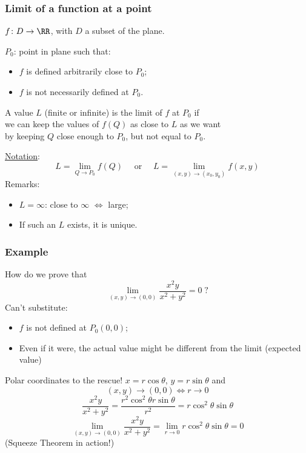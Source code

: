 \begin{frame}
\frametitle{Limit of a function at a point}
  $f\colon D \to \RR$, with $D$ a subset of the plane.

  $P_0$: point in plane such that:
  \begin{itemize}
    \item $f$ is defined arbitrarily close to $P_0$;
    \item $f$ is not necessarily defined at $P_0$.
  \end{itemize}

  \begin{definition}
    A value $L$ (finite or infinite) is
    \textcolor[rgb]{0.98,0.00,0.00}{the limit of $f$ at $P_0$} if \\
    we can keep the values of $f(Q)$ as close to $L$ as we want \\
    by keeping $Q$ close enough to $P_0$, but not equal to $P_0$.
  \end{definition}

  \underline{Notation}:
  $$L = \lim_{Q\to P_0} f(Q) \quad \text{ or } \quad
  L = \lim_{(x,y) \to (x_0,y_0)} f(x,y)$$
  \pause
  Remarks:
  \begin{itemize}
    \item $L=\infty$: close to $\infty$ $\Longleftrightarrow$ large;
    \item If such an $L$ exists, it is unique.
  \end{itemize}

\end{frame}

\begin{frame}
  \frametitle{Example}

  How do we prove that
  $$\lim_{(x,y) \to (0,0)} \frac{x^2y}{x^2+y^2} =0 \; ?$$
  \pause
  Can't substitute:
  \begin{itemize}
    \item $f$ is not defined at $P_0(0,0)$;
    \item Even if it were, the actual value might be different from the limit (expected value)
  \end{itemize}
  \pause
  Polar coordinates to the rescue!
  $x=r\cos\theta$, $y =r \sin\theta$ and
  $$(x,y) \to (0,0) \Longleftrightarrow r\to 0$$
  $$\frac{x^2y}{x^2+y^2} = \frac{r^2\cos^2\theta r\sin\theta}{r^2} = r\cos^2{\theta}\sin\theta$$
  $$\lim_{(x,y) \to (0,0)} \frac{x^2y}{x^2+y^2} = \lim_{r\to 0} r\cos^2{\theta}\sin\theta = 0$$
  \pause (Squeeze Theorem in action!)
\end{frame}


